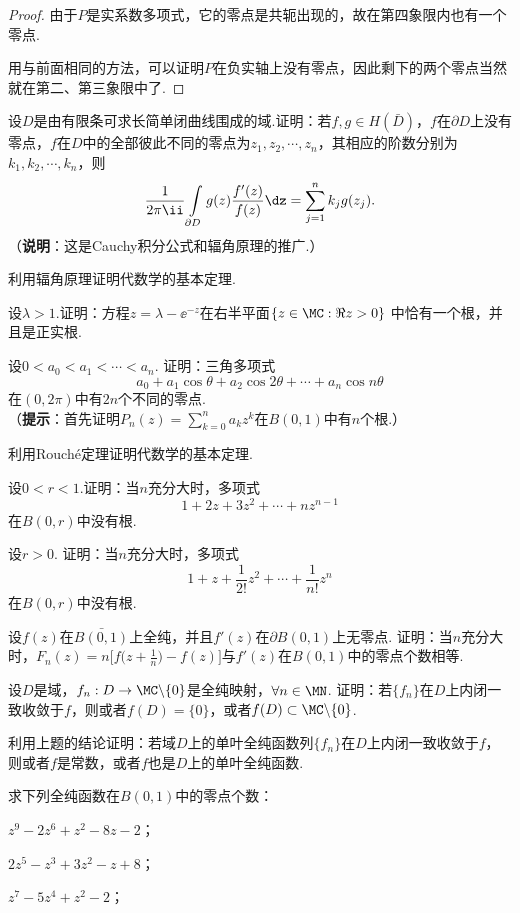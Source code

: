 \begin{proof}
由于$P$是实系数多项式，它的零点是共轭出现的，故在第四象限内也有一个零点.

用与前面相同的方法，可以证明$P$在负实轴上没有零点，因此剩下的两个零点当然就在第二、第三象限中了.
\end{proof}

\begin{xiti}\hypertarget{xiti4.4}{}
\item 设$D$是由有限条可求长简单闭曲线围成的域.证明：若$f,g\in H(\bar D)$，$f$在$\partial D$上没有零点，$f$在$D$中的全部彼此不同的零点为$z_1,z_2,\cdots,z_n$，其相应的阶数分别为$k_1,k_2,\cdots,k_n$，则
    \[\frac1{2\pi\ii}\int\limits_{\partial D}g(z)\frac{f'(z)}{f(z)}\dz=\sum_{j=1}^nk_jg(z_j).\]
（\textbf{说明}：这是Cauchy积分公式和辐角原理的推广.）
\item 利用辐角原理证明代数学的基本定理.
\item 设$\lambda>1$.证明：方程$z=\lambda-\ee^{-z}$在右半平面$\{z\in\MC:\Re z>0\}$
中恰有一个根，并且是正实根.
\item 设$0<a_0<a_1<\cdots<a_n$. 证明：三角多项式
\[a_0+a_1\cos\theta+a_2\cos2\theta+\cdots+a_n\cos n\theta\]
在$(0,2\pi)$中有$2n$个不同的零点.\\
（\textbf{提示}：首先证明$P_n(z)=\sum_{k=0}^n a_kz^k$在$B(0,1)$中有$n$个根.）
\item 利用Rouch\'e定理证明代数学的基本定理.
\item 设$0<r<1$.证明：当$n$充分大时，多项式
\[1+2z+3z^2+\cdots+nz^{n-1}\]
在$B(0,r)$中没有根.
\item 设$r>0$. 证明：当$n$充分大时，多项式
   \[1+z+\frac1{2!}z^2+\cdots+\frac1{n!}z^n\]
在$B(0,r)$中没有根.
\item 设$f(z)$在$\bar{B(0,1)}$上全纯，并且$f'(z)$在$\partial B(0,1)$上无零点. 证明：当$n$充分大时，$F_n(z)=n\bigg[f\bigg(z+\frac1n\bigg)-f(z)\bigg]$与$f'(z)$在$B(0,1)$中的零点个数相等.
\item 设$D$是域，$f_n:D\to\MC\backslash\{0\}$是全纯映射，$\forall n\in \MN$. 证明：若$\{f_n\}$在$D$上内闭一致收敛于$f$，则或者$f(D)=\{0\}$，或者$f(D)\subset\MC\backslash\{0\}$.
\item 利用上题的结论证明：若域$D$上的单叶全纯函数列$\{f_n\}$在$D$上内闭一致收敛于$f$，则或者$f$是常数，或者$f$也是$D$上的单叶全纯函数.
\item 求下列全纯函数在$B(0,1)$中的零点个数：
\begin{enuma}
  \item $z^9-2z^6+z^2-8z-2$；
  \item $2z^5-z^3+3z^2-z+8$；
  \item $z^7-5z^4+z^2-2$；

\end{enuma}
\end{xiti}
